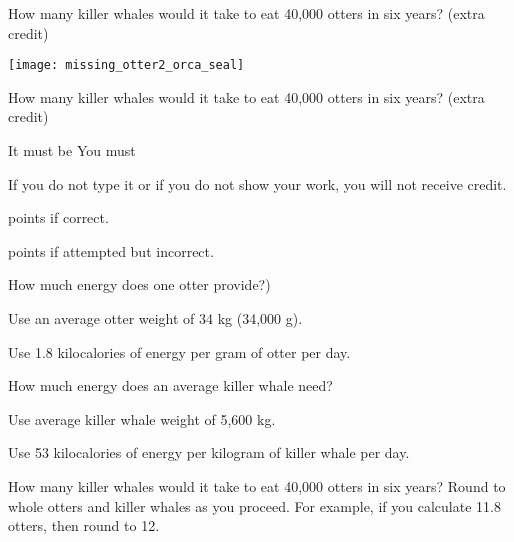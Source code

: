 \documentclass[t]{beamer}
\begin{document}
%
\begin{frame}[t]{How many killer whales would it take to eat 40,000 otters in six years? (extra credit)}

	\texttt{[image: missing\_otter2\_orca\_seal]}

\end{frame}
%
\begin{frame}[t]{How many killer whales would it take to eat 40,000 otters in six years? (extra credit)}

	\hangpara It must be  You must 

	\hangpara If you do not type it or if you do not show your work, you will not receive credit.

	 points if correct.

	 points if attempted but incorrect.
	
	

\end{frame}
%
\begin{frame}[t]{How much energy does one otter provide?)}

	\hangpara Use an average otter weight of 34 kg (34,000 g).
	
	\hangpara Use 1.8 kilocalories of energy per gram of otter per day.


\end{frame}
%
\begin{frame}[t]{How much energy does an average killer whale need?}

	\hangpara Use average killer whale weight of 5,600 kg.
	
	\hangpara Use 53 kilocalories of energy per kilogram of killer whale per day.
		
	\hangpara How many killer whales would it take to eat 40,000 otters in six years?\newline
		\hspace*{1em} Round to whole otters and killer whales as you proceed.\newline
		\hspace*{1em} For example, if you  calculate 11.8 otters, then round to 12.


\end{frame}
%
\end{document}
